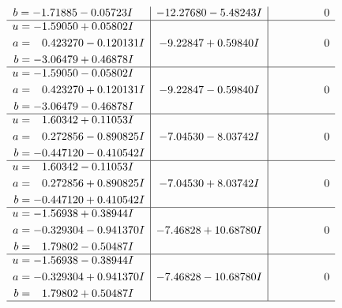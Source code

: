 \documentclass[1p]{elsarticle_modified}
\theoremstyle{definition}
\begin{document}
$$\begin{array}{c|c|c}
\begin{aligned}
b &= -1.71885 - 0.05723 I\end{aligned}
 & -12.27680 - 5.48243 I & \phantom{-0.000000 } 0 \\ \hline\begin{aligned}
u &= -1.59050 + 0.05802 I \\
a &= \phantom{-}0.423270 - 0.120131 I \\
b &= -3.06479 + 0.46878 I\end{aligned}
 & -9.22847 + 0.59840 I & \phantom{-0.000000 } 0 \\ \hline\begin{aligned}
u &= -1.59050 - 0.05802 I \\
a &= \phantom{-}0.423270 + 0.120131 I \\
b &= -3.06479 - 0.46878 I\end{aligned}
 & -9.22847 - 0.59840 I & \phantom{-0.000000 } 0 \\ \hline\begin{aligned}
u &= \phantom{-}1.60342 + 0.11053 I \\
a &= \phantom{-}0.272856 - 0.890825 I \\
b &= -0.447120 - 0.410542 I\end{aligned}
 & -7.04530 - 8.03742 I & \phantom{-0.000000 } 0 \\ \hline\begin{aligned}
u &= \phantom{-}1.60342 - 0.11053 I \\
a &= \phantom{-}0.272856 + 0.890825 I \\
b &= -0.447120 + 0.410542 I\end{aligned}
 & -7.04530 + 8.03742 I & \phantom{-0.000000 } 0 \\ \hline\begin{aligned}
u &= -1.56938 + 0.38944 I \\
a &= -0.329304 - 0.941370 I \\
b &= \phantom{-}1.79802 - 0.50487 I\end{aligned}
 & -7.46828 + 10.68780 I & \phantom{-0.000000 } 0 \\ \hline\begin{aligned}
u &= -1.56938 - 0.38944 I \\
a &= -0.329304 + 0.941370 I \\
b &= \phantom{-}1.79802 + 0.50487 I\end{aligned}
 & -7.46828 - 10.68780 I & \phantom{-0.000000 } 0\\
 \hline 
 \end{array}$$\newpage$$\begin{array}{c|c|c}  

\end{array}$$
\end{document}
